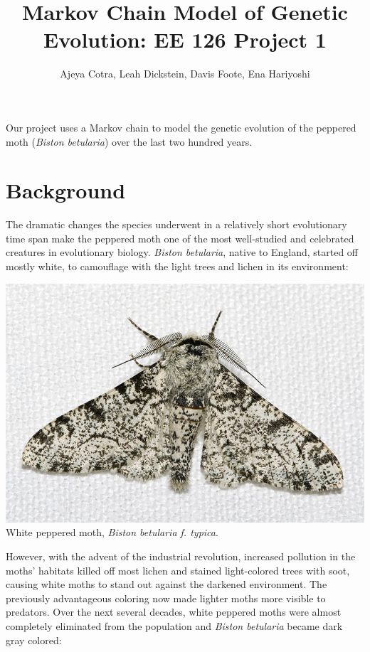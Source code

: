 \documentclass[leqno]{article}
\begin{document}
\title{Markov Chain Model of Genetic Evolution: EE 126 Project 1}
\author{Ajeya Cotra, Leah Dickstein, Davis Foote, Ena Hariyoshi}

\maketitle
 
\setlength{\parskip}{\baselineskip}

Our project uses a Markov chain to model the genetic evolution of the peppered moth ({\it Biston betularia}) over the last two hundred years.

\section{Background}

The dramatic changes the species underwent in a relatively short evolutionary time span make the peppered moth one of the most well-studied and celebrated creatures in evolutionary biology. {\it Biston betularia}, native to England, started off mostly white, to camouflage with the light trees and lichen in its environment:

\begin{center}
\includegraphics[scale=0.8]{white_peppered_moth.jpg}{\\White peppered moth, {\it Biston betularia f. typica}.}
\end{center}

However, with the advent of the industrial revolution, increased pollution in the moths' habitats killed off most lichen and stained light-colored trees with soot, causing white moths to stand out against the darkened environment. The previously advantageous coloring now made lighter moths more visible to predators. Over the next several decades, white peppered moths were almost completely eliminated from the population and {\it Biston betularia} became dark gray colored:
\end{document}
